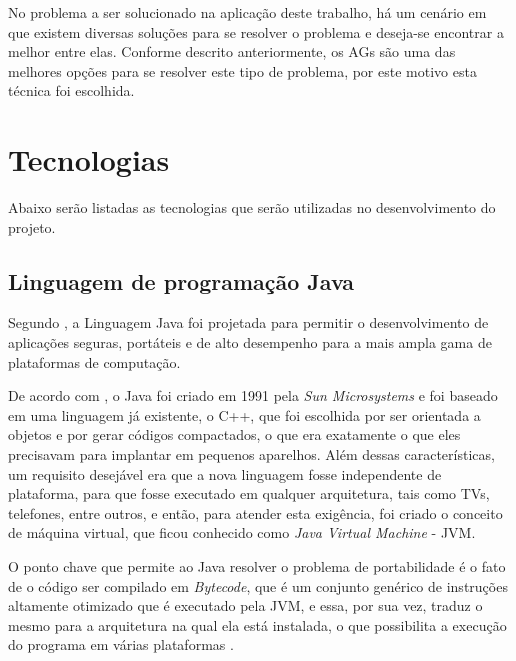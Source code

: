 \par No problema a ser solucionado na aplicação deste trabalho, há um
cenário em que existem diversas soluções para se resolver o problema e deseja-se
encontrar a melhor entre elas. Conforme descrito anteriormente, os AGs são uma
das melhores opções para se resolver este tipo de problema, por este motivo esta técnica foi escolhida.


\section{Tecnologias}

\par Abaixo serão listadas as tecnologias que serão utilizadas no
desenvolvimento do projeto.

\subsection{Linguagem de programação Java}

\par Segundo , a Linguagem Java foi projetada
para permitir o desenvolvimento de aplicações seguras, portáteis
e de alto desempenho para a mais ampla gama de plataformas de computação.

\par De acordo com , o Java foi
criado em 1991 pela \textit{Sun Microsystems} e foi baseado em uma linguagem já
existente, o C++, que foi escolhida por ser orientada a objetos e
por gerar códigos compactados, o que era exatamente o que eles precisavam para
implantar em pequenos aparelhos. Além dessas características, um requisito
desejável era que a nova linguagem fosse independente de plataforma, para que
fosse executado em qualquer arquitetura, tais como TVs, telefones, entre
outros, e então, para atender esta exigência, foi
criado o conceito de máquina virtual, que ficou conhecido como \textit{Java
Virtual Machine} - JVM\footnotemark[2].


\par O ponto chave que permite ao Java resolver o problema de portabilidade é o fato de o código ser
compilado em \textit{Bytecode}, que é um conjunto genérico de instruções
altamente otimizado que é executado pela JVM, e essa, por sua vez, traduz o
mesmo para a arquitetura na qual ela está instalada, o que possibilita a execução do programa
em várias plataformas \cite{livro_java_complete_references}.

